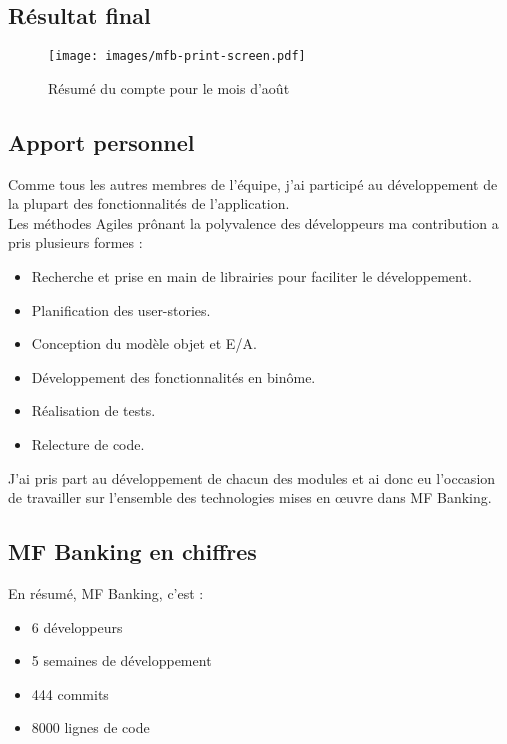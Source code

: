 \subsection{Résultat final}

\begin{figure}[H]
	\centering
	\texttt{[image: images/mfb-print-screen.pdf]}
	\caption{Résumé du compte pour le mois d'août}
\end{figure}

\subsection{Apport personnel}

Comme tous les autres membres de l'équipe, j'ai participé au développement de la plupart des fonctionnalités de l'application.\\
Les méthodes Agiles prônant la polyvalence des développeurs ma contribution a pris plusieurs formes :
\begin{itemize}
	\item Recherche et prise en main de librairies pour faciliter le développement.
	\item Planification des user-stories.  
	\item Conception du modèle objet et E/A.
	\item Développement des fonctionnalités en binôme.
	\item Réalisation de tests.
	\item Relecture de code.\\
\end{itemize}

J'ai pris part au développement de chacun des modules et ai donc eu l'occasion de travailler sur l'ensemble des technologies mises en œuvre dans MF Banking.\\
 
\subsection*{MF Banking en chiffres}

En résumé, MF Banking, c'est : 
\begin{itemize}
	\item 6 développeurs
	\item 5 semaines de développement
	\item 444 commits
	\item 8000 lignes de code
\end{itemize}

